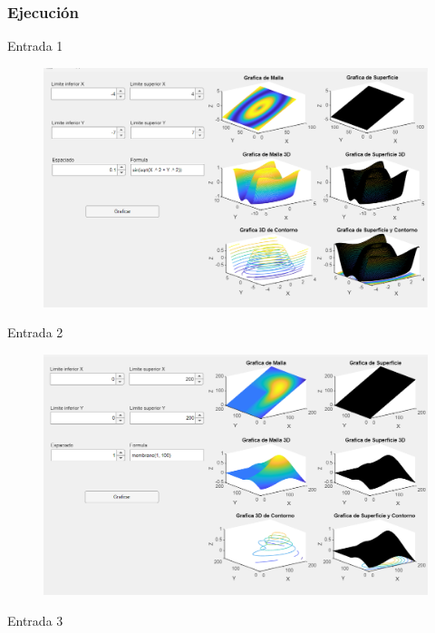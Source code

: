 \documentclass{article}
\begin{document}
	\newpage
	
	\subsubsection{Ejecución}
	
	Entrada 1
	
	\begin{figure}[h]
		\centering
		\includegraphics[width=17cm]{img2.png}
	\end{figure}
	
	Entrada 2
	
	\begin{figure}[!h]
		\centering
		\includegraphics[width=17cm]{img3.png}
	\end{figure}
	
	\newpage
	
	Entrada 3
	
\end{document}
